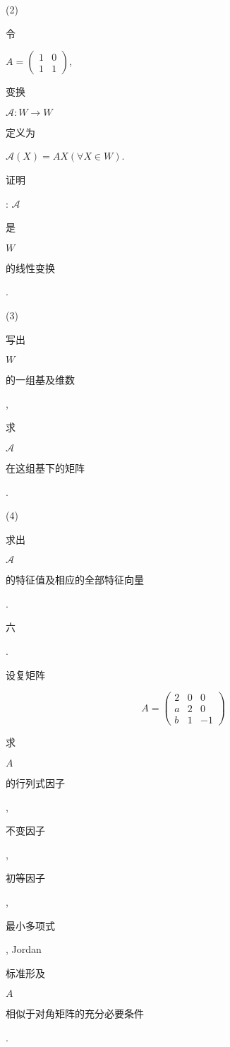 \documentclass[10pt]{article}
\begin{document}
(2) \begin{CJK}{UTF8}{mj}令\end{CJK} $A=\left(\begin{array}{ll}1 & 0 \\ 1 & 1\end{array}\right)$, \begin{CJK}{UTF8}{mj}变换\end{CJK} $\mathscr{A}: W \rightarrow W$ \begin{CJK}{UTF8}{mj}定义为\end{CJK} $\mathscr{A}(X)=A X(\forall X \in W)$. \begin{CJK}{UTF8}{mj}证明\end{CJK}: $\mathscr{A}$ \begin{CJK}{UTF8}{mj}是\end{CJK} $W$ \begin{CJK}{UTF8}{mj}的线性变换\end{CJK}.

(3) \begin{CJK}{UTF8}{mj}写出\end{CJK} $W$ \begin{CJK}{UTF8}{mj}的一组基及维数\end{CJK}, \begin{CJK}{UTF8}{mj}求\end{CJK} $\mathscr{A}$ \begin{CJK}{UTF8}{mj}在这组基下的矩阵\end{CJK}.

(4) \begin{CJK}{UTF8}{mj}求出\end{CJK} $\mathscr{A}$ \begin{CJK}{UTF8}{mj}的特征值及相应的全部特征向量\end{CJK}.

\begin{CJK}{UTF8}{mj}六\end{CJK}. \begin{CJK}{UTF8}{mj}设复矩阵\end{CJK}
$$
A=\left(\begin{array}{ccc}
2 & 0 & 0 \\
a & 2 & 0 \\
b & 1 & -1
\end{array}\right)
$$
\begin{CJK}{UTF8}{mj}求\end{CJK} $A$ \begin{CJK}{UTF8}{mj}的行列式因子\end{CJK}, \begin{CJK}{UTF8}{mj}不变因子\end{CJK}, \begin{CJK}{UTF8}{mj}初等因子\end{CJK}, \begin{CJK}{UTF8}{mj}最小多项式\end{CJK}, Jordan \begin{CJK}{UTF8}{mj}标准形及\end{CJK} $A$ \begin{CJK}{UTF8}{mj}相似于对角矩阵的充分必要条件\end{CJK}.
\end{document}
